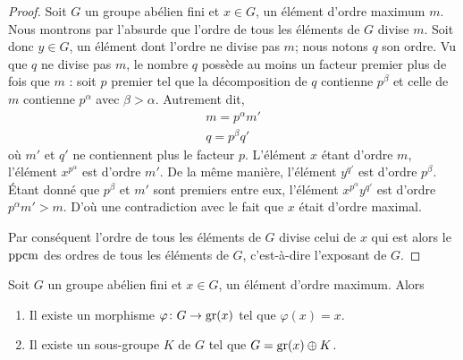 \begin{proof}
    Soit \( G\) un groupe abélien fini et \( x\in G\), un élément d'ordre maximum \( m\). Nous montrons par l'absurde que l'ordre de tous les éléments de \( G\) divise \( m\). Soit donc \( y\in G\), un élément dont l'ordre ne divise pas \( m\); nous notons $q$ son ordre. Vu que \( q\) ne divise pas \( m\), le nombre \( q\) possède au moins un facteur premier plus de fois que \( m\) : soit \( p\) premier tel que la décomposition de \( q\) contienne \( p^{\beta}\) et celle de \( m\) contienne \( p^{\alpha}\) avec \( \beta>\alpha\). Autrement dit,
    \begin{subequations}
        \begin{align}
            m=p^{\alpha}m'\\
            q=p^{\beta}q'
        \end{align}
    \end{subequations}
    où \( m'\) et \( q'\) ne contiennent plus le facteur \( p\). L'élément \( x\) étant d'ordre \( m\), l'élément \( x^{p^{\alpha}}\) est d'ordre \( m'\). De la même manière, l'élément \( y^{q'}\) est d'ordre \( p^{\beta}\). Étant donné que \( p^{\beta}\) et \( m'\) sont premiers entre eux, l'élément  \( x^{p^{\alpha}}y^{q'}\) est d'ordre \( p^{\alpha}m'>m\). D'où une contradiction avec le fait que \( x\) était d'ordre maximal.

    Par conséquent l'ordre de tous les éléments de $G$ divise celui de \( x\) qui est alors le \( \operatorname{ppcm}\) des ordres de tous les éléments de \( G\), c'est-à-dire l'exposant de \( G\).
\end{proof}

\begin{proposition} \label{PropfPRVxi}
    Soit \( G\) un groupe abélien fini et \( x\in G\), un élément d'ordre maximum. Alors
    \begin{enumerate}
        \item
            Il existe un morphisme \( \varphi\colon G\to \operatorname{gr}(x)\) tel que \( \varphi(x)=x\).
        \item   \label{ItemKRYwjU}
            Il existe un sous-groupe \( K\) de \( G\) tel que \( G=\operatorname{gr}(x)\oplus K\).
    \end{enumerate}
\end{proposition}


